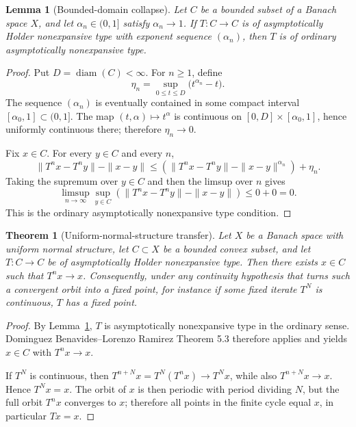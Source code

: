 \documentclass[11pt]{article}
\newtheorem{theorem}{Theorem}
\newtheorem{lemma}{Lemma}
\newcommand{\diam}{\operatorname{diam}}
\newcommand{\limsupn}{\limsup_{n\to\infty}}
\begin{document}
\begin{lemma}[Bounded-domain collapse]\label{lem:collapse}
Let \(C\) be a bounded subset of a Banach space \(X\), and let
\(\alpha_n\in(0,1]\) satisfy \(\alpha_n\to 1\). If \(T:C\to C\) is of
asymptotically Holder nonexpansive type with exponent sequence
\((\alpha_n)\), then \(T\) is of ordinary asymptotically nonexpansive type.
\end{lemma}

\begin{proof}
Put \(D=\diam(C)<\infty\).  For \(n\ge 1\), define
\[
 \eta_n=\sup_{0\le t\le D}\bigl(t^{\alpha_n}-t\bigr).
\]
The sequence \((\alpha_n)\) is eventually contained in some compact interval
\([\alpha_0,1]\subset(0,1]\).  The map \((t,\alpha)\mapsto t^\alpha\) is
continuous on \([0,D]\times[\alpha_0,1]\), hence uniformly continuous there;
therefore \(\eta_n\to 0\).

Fix \(x\in C\).  For every \(y\in C\) and every \(n\),
\[
\|T^n x-T^n y\|-\|x-y\|
\le
\left(\|T^n x-T^n y\|-\|x-y\|^{\alpha_n}\right)+\eta_n .
\]
Taking the supremum over \(y\in C\) and then the limsup over \(n\) gives
\[
\limsupn \sup_{y\in C}\left(\|T^n x-T^n y\|-\|x-y\|\right)
\le 0+0=0.
\]
This is the ordinary asymptotically nonexpansive type condition.
\end{proof}

\begin{theorem}[Uniform-normal-structure transfer]\label{thm:uns}
Let \(X\) be a Banach space with uniform normal structure, let \(C\subset X\)
be a bounded convex subset, and let \(T:C\to C\) be of asymptotically Holder
nonexpansive type. Then there exists \(x\in C\) such that \(T^n x\to x\).
Consequently, under any continuity hypothesis that turns such a convergent
orbit into a fixed point, for instance if some fixed iterate \(T^N\) is
continuous, \(T\) has a fixed point.
\end{theorem}

\begin{proof}
By Lemma~\ref{lem:collapse}, \(T\) is asymptotically nonexpansive type in the
ordinary sense.  Dominguez Benavides--Lorenzo Ramirez Theorem 5.3 therefore
applies and yields \(x\in C\) with \(T^n x\to x\).

If \(T^N\) is continuous, then \(T^{n+N}x=T^N(T^n x)\to T^Nx\), while also
\(T^{n+N}x\to x\).  Hence \(T^N x=x\).  The orbit of \(x\) is then periodic
with period dividing \(N\), but the full orbit \(T^n x\) converges to \(x\);
therefore all points in the finite cycle equal \(x\), in particular \(Tx=x\).
\end{proof}
\end{document}
